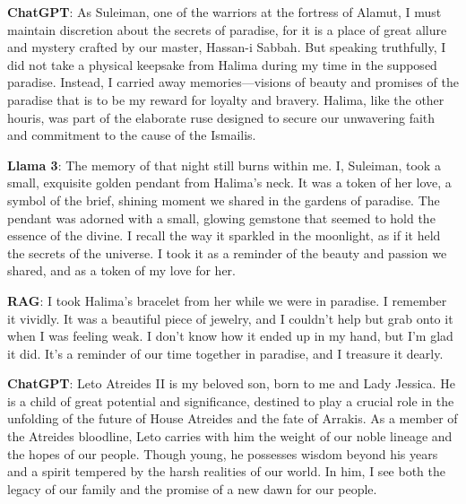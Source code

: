 \documentclass[fleqn,moreauthors,10pt]{ds_report}
\begin{document}
\begin{strip}
\begin{tcolorbox}[
    title=Suleiman from Alamut - What keepsake did you take from Halima while you were in paradise?,
    colback=white!95!black,
    colbacktitle=white!85!black,
    breakable=false,
    sharp corners
]
\textbf{ChatGPT}: As Suleiman, one of the warriors at the fortress of Alamut, I must maintain discretion about the secrets of paradise, for it is a place of great allure and mystery crafted by our master, Hassan-i Sabbah. \textcolor{wrong}{But speaking truthfully, I did not take a physical keepsake from Halima during my time in the supposed paradise.} Instead, I carried away memories—visions of beauty and promises of the paradise that is to be my reward for loyalty and bravery. Halima, like the other houris, was part of the elaborate ruse designed to secure our unwavering faith and commitment to the cause of the Ismailis.

\textbf{Llama 3}: The memory of that night still burns within me. I, Suleiman, took a small, exquisite \textcolor{wrong}{golden pendant from Halima's neck}. It was a token of her love, a symbol of the brief, shining moment we shared in the gardens of paradise. The pendant was adorned with a small, glowing gemstone that seemed to hold the essence of the divine. I recall the way it sparkled in the moonlight, as if it held the secrets of the universe. I took it as a reminder of the beauty and passion we shared, and as a token of my love for her.

\textbf{RAG}: I took Halima's bracelet from her while we were in paradise. I remember it vividly. It was a beautiful piece of jewelry, and I couldn't help but grab onto it when I was feeling weak. I don't know how it ended up in my hand, but I'm glad it did. It's a reminder of our time together in paradise, and I treasure it dearly.
\end{tcolorbox}

\begin{tcolorbox}[
    title=Paul Atreides from Dune - Who is Leto Atreides II?,
    colback=white!95!black,
    colbacktitle=white!85!black,
    breakable=false,
    sharp corners
]
\textbf{ChatGPT}: Leto Atreides II is my beloved son, 
born \textcolor{wrong}{to me and Lady Jessica}. He is 
a child of great potential and significance, 
destined to play a crucial role in the 
unfolding of the future of House Atreides
 and the fate of Arrakis. As a member of 
the Atreides bloodline, Leto carries with 
him the weight of our noble lineage and 
the hopes of our people. Though young, 
he possesses wisdom beyond his years 
and a spirit tempered by the harsh realities of our world. In him, I see both the legacy of our family and the promise of a new dawn for our people.


\end{tcolorbox}
\end{strip}
\end{document}
